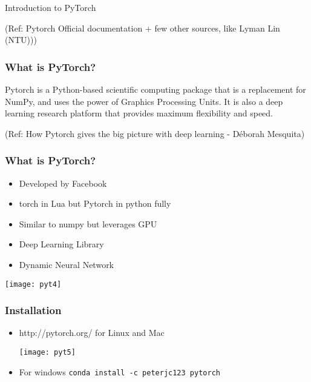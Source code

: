 \begin{frame}
  \begin{center}
    {\Large Introduction to PyTorch}
    
\tiny{(Ref: Pytorch Official documentation + few other sources, like Lyman Lin (NTU)))}
  \end{center}
\end{frame}

\begin{frame}[fragile] \frametitle{What is PyTorch?}
  \begin{center}

{\Large Pytorch is a Python-based scientific computing package that is a replacement for NumPy, and uses the power of Graphics Processing Units. It is also a deep learning research platform that provides maximum flexibility and speed.}

  \end{center}

  {\tiny (Ref: How Pytorch gives the big picture with deep learning - Déborah Mesquita)}
\end{frame}

\begin{frame}[fragile] \frametitle{What is PyTorch?}
\begin{itemize}
\item  Developed by Facebook
\item torch in Lua but Pytorch in python fully
\item Similar to numpy but leverages GPU
\item Deep Learning Library
\item  Dynamic Neural Network
\end{itemize}
\begin{center}
\texttt{[image: pyt4]}
\end{center}
\end{frame}

\begin{frame}[fragile] \frametitle{Installation}

\begin{itemize}
\item  http://pytorch.org/ for Linux and Mac
\begin{center}
\texttt{[image: pyt5]}
\end{center}
\item For windows \lstinline|conda install -c peterjc123 pytorch|
\end{itemize}

\end{frame}


